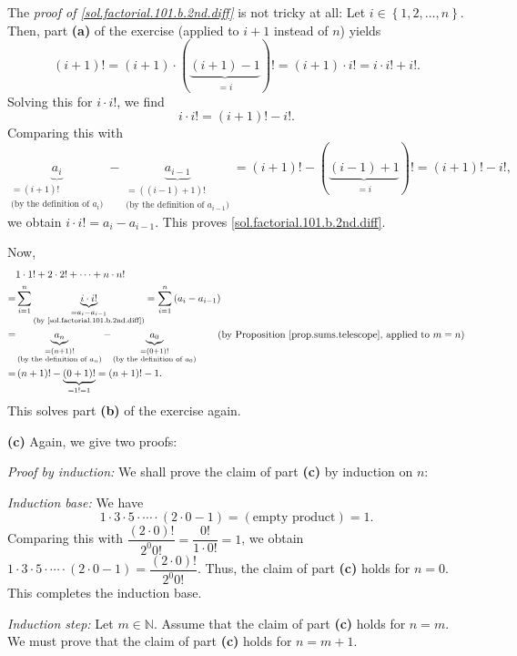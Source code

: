 \documentclass[paper=a4, fontsize=12pt]{scrartcl} %
\newcommand{\NN}{\mathbb{N}} %
\newcommand{\set}[1]{\left\{ #1 \right\}}
\newcommand{\tup}[1]{\left( #1 \right)}
\newcommand{\underbrack}[2]{\underbrace{#1}_{\substack{#2}}}
\let\sumnonlimits\sum
\renewcommand{\sum}{\sumnonlimits\limits}
\theoremstyle{plainsl}
\theoremstyle{definition}
\theoremstyle{remark}
\begin{document}
The \textit{proof of \eqref{sol.factorial.101.b.2nd.diff}} is not tricky at
all:
Let $i \in \set{1, 2, \ldots, n}$.
Then, part \textbf{(a)} of the exercise (applied to $i+1$
instead of $n$) yields
\[
\tup{i+1}! = \tup{i+1} \cdot \tup{ \underbrack{\tup{i+1}-1}{= i} }!
= \tup{i+1} \cdot i! = i\cdot i! + i!.
\]
Solving this for $i\cdot i!$, we find
\[
i\cdot i! = \tup{i+1}! - i!.
\]
Comparing this with
\[
\underbrack{a_i}{= \tup{i+1}! \\ \text{(by the definition of $a_i$)}}
  - \underbrack{a_{i-1}}{= \tup{\tup{i-1}+1}! \\ \text{(by the definition of $a_{i-1}$)}}
= \tup{i+1}! - \tup{ \underbrack{\tup{i-1}+1}{= i} }!
= \tup{i+1}! - i!,
\]
we obtain $i\cdot i! = a_i - a_{i-1}$.
This proves \eqref{sol.factorial.101.b.2nd.diff}.

Now,
\begin{align*}
  & 1\cdot 1! + 2\cdot 2! + \cdots + n\cdot n! \\
= & \sum_{i=1}^{n} \underbrack{i\cdot i!}{= a_i - a_{i-1} \\
                  \text{(by \eqref{sol.factorial.101.b.2nd.diff})}}
=   \sum_{i=1}^{n} \tup{a_i - a_{i-1}} \\
= & \underbrack{a_n}{= \tup{n+1}! \\ \text{(by the definition of $a_n$)}}
  - \underbrack{a_0}{= \tup{0+1}! \\ \text{(by the definition of $a_0$)}}
  \qquad \tup{  
     \text{by Proposition \ref{prop.sums.telescope}, applied to } m=n} \\
= & \tup{n+1}! - \underbrack{\tup{0+1}!}{= 1! = 1}
=   \tup{n+1}! - 1.
\end{align*}
This solves part \textbf{(b)} of the exercise again.

\vspace{0.806pc}

\textbf{(c)} Again, we give two proofs:

\textit{Proof by induction:} We shall prove the claim of part \textbf{(c)}
by induction on $n$:

\textit{Induction base:} We have
\[
1\cdot 3\cdot 5\cdot \cdots \cdot \tup{2 \cdot 0 - 1}
= \tup{\text{empty product}} = 1 .
\]
Comparing this with $\dfrac{\tup{2 \cdot 0}!}{2^0 0!}
= \dfrac{0!}{1\cdot 0!} = 1$, we obtain
$1\cdot 3\cdot 5\cdot \cdots \cdot \tup{2 \cdot 0 - 1}
=\dfrac{\tup{2 \cdot 0}!}{2^0 0!}$. Thus, the claim of
part \textbf{(c)} holds for $n = 0$.
This completes the induction base.

\textit{Induction step:} Let $m \in \NN$.
Assume that the claim of part \textbf{(c)} holds for $n = m$.
We must prove that the claim of part \textbf{(c)} holds for $n = m+1$.
\end{document}
